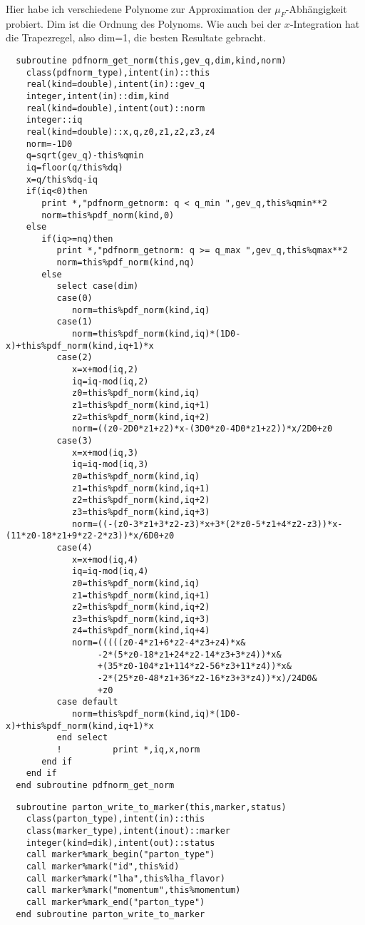Hier habe ich verschiedene Polynome zur Approximation der $\mu_F$-Abhängigkeit probiert. Dim ist die Ordnung des Polynoms. Wie auch bei der $x$-Integration hat die Trapezregel, also dim=1, die besten Resultate gebracht.
\begin{Verbatim}
  subroutine pdfnorm_get_norm(this,gev_q,dim,kind,norm)
    class(pdfnorm_type),intent(in)::this
    real(kind=double),intent(in)::gev_q
    integer,intent(in)::dim,kind
    real(kind=double),intent(out)::norm
    integer::iq
    real(kind=double)::x,q,z0,z1,z2,z3,z4
    norm=-1D0
    q=sqrt(gev_q)-this%qmin
    iq=floor(q/this%dq)
    x=q/this%dq-iq
    if(iq<0)then
       print *,"pdfnorm_getnorm: q < q_min ",gev_q,this%qmin**2
       norm=this%pdf_norm(kind,0)
    else
       if(iq>=nq)then
          print *,"pdfnorm_getnorm: q >= q_max ",gev_q,this%qmax**2
          norm=this%pdf_norm(kind,nq)
       else
          select case(dim)
          case(0)
             norm=this%pdf_norm(kind,iq)
          case(1)
             norm=this%pdf_norm(kind,iq)*(1D0-x)+this%pdf_norm(kind,iq+1)*x
          case(2)
             x=x+mod(iq,2)
             iq=iq-mod(iq,2)
             z0=this%pdf_norm(kind,iq)
             z1=this%pdf_norm(kind,iq+1)
             z2=this%pdf_norm(kind,iq+2)
             norm=((z0-2D0*z1+z2)*x-(3D0*z0-4D0*z1+z2))*x/2D0+z0
          case(3)
             x=x+mod(iq,3)
             iq=iq-mod(iq,3)
             z0=this%pdf_norm(kind,iq)
             z1=this%pdf_norm(kind,iq+1)
             z2=this%pdf_norm(kind,iq+2)
             z3=this%pdf_norm(kind,iq+3)
             norm=((-(z0-3*z1+3*z2-z3)*x+3*(2*z0-5*z1+4*z2-z3))*x-(11*z0-18*z1+9*z2-2*z3))*x/6D0+z0
          case(4)
             x=x+mod(iq,4)
             iq=iq-mod(iq,4)
             z0=this%pdf_norm(kind,iq)
             z1=this%pdf_norm(kind,iq+1)
             z2=this%pdf_norm(kind,iq+2)
             z3=this%pdf_norm(kind,iq+3)
             z4=this%pdf_norm(kind,iq+4)
             norm=(((((z0-4*z1+6*z2-4*z3+z4)*x&
                  -2*(5*z0-18*z1+24*z2-14*z3+3*z4))*x&
                  +(35*z0-104*z1+114*z2-56*z3+11*z4))*x&
                  -2*(25*z0-48*z1+36*z2-16*z3+3*z4))*x)/24D0&
                  +z0
          case default
             norm=this%pdf_norm(kind,iq)*(1D0-x)+this%pdf_norm(kind,iq+1)*x
          end select
          !          print *,iq,x,norm
       end if
    end if
  end subroutine pdfnorm_get_norm
\end{Verbatim}
\begin{Verbatim}
  subroutine parton_write_to_marker(this,marker,status)
    class(parton_type),intent(in)::this
    class(marker_type),intent(inout)::marker
    integer(kind=dik),intent(out)::status
    call marker%mark_begin("parton_type")
    call marker%mark("id",this%id)
    call marker%mark("lha",this%lha_flavor)
    call marker%mark("momentum",this%momentum)
    call marker%mark_end("parton_type")
  end subroutine parton_write_to_marker
\end{Verbatim}
